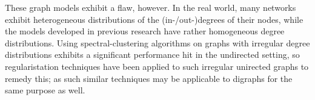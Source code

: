 These graph models exhibit a flaw, however. In the real world, many networks exhibit heterogeneous 
distributions of the (in-/out-)degrees of their nodes, while the models developed in previous 
research have rather homogeneous degree distributions. Using spectral-clustering algorithms on 
graphs with irregular degree distributions exhibits a significant performance hit in the undirected 
setting, so regularistation techniques have been applied to such irregular unirected graphs to
remedy this; as such similar techniques may be applicable to digraphs for the same purpose as well.

